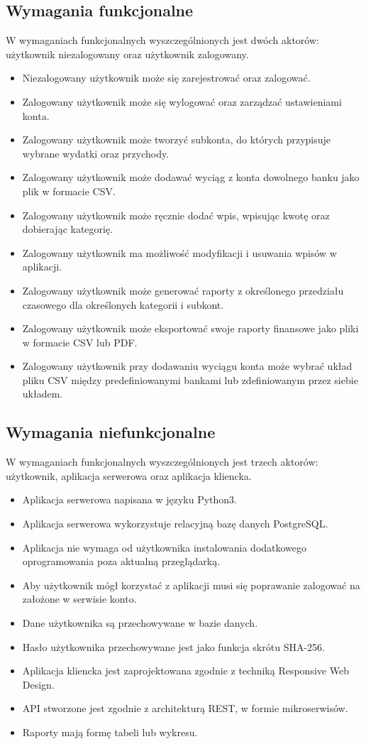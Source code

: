 \documentclass{article}
\begin{document}
	\subsection{Wymagania funkcjonalne}
	W wymaganiach funkcjonalnych wyszczególnionych jest dwóch aktorów: użytkownik niezalogowany oraz użytkownik zalogowany.
	\begin{itemize}
		\item Niezalogowany użytkownik może się zarejestrować oraz zalogować.
		\item Zalogowany użytkownik może się wylogować oraz zarządzać ustawieniami konta.
		\item Zalogowany użytkownik może tworzyć subkonta, do których przypisuje wybrane wydatki oraz przychody.
		\item Zalogowany użytkownik może dodawać wyciąg z konta dowolnego banku jako plik w formacie CSV.
		\item Zalogowany użytkownik może ręcznie dodać wpis, wpisując kwotę oraz dobierając kategorię.
		\item Zalogowany użytkownik ma możliwość modyfikacji i usuwania wpisów w aplikacji.
		\item Zalogowany użytkownik może generować raporty z określonego przedziału czasowego dla określonych kategorii i subkont.
		\item Zalogowany użytkownik może eksportować swoje raporty finansowe jako pliki w formacie CSV lub PDF.
		\item Zalogowany użytkownik przy dodawaniu wyciągu konta może wybrać układ pliku CSV między predefiniowanymi bankami lub zdefiniowanym przez siebie układem.
		
	\end{itemize}
	\subsection{Wymagania niefunkcjonalne}
	W wymaganiach funkcjonalnych wyszczególnionych jest trzech aktorów: użytkownik, aplikacja serwerowa oraz aplikacja kliencka.
	\begin{itemize}
		\item Aplikacja serwerowa napisana w języku Python3.
		\item Aplikacja serwerowa wykorzystuje relacyjną bazę danych PostgreSQL.
		\item Aplikacja nie wymaga od użytkownika instalowania dodatkowego oprogramowania poza aktualną przeglądarką.
		\item Aby użytkownik mógł korzystać z aplikacji musi się poprawanie zalogować na założone w serwisie konto.
		\item Dane użytkownika są przechowywane w bazie danych.
		\item Hasło użytkownika przechowywane jest jako funkcja skrótu SHA-256.
		\item Aplikacja kliencka jest zaprojektowana zgodnie z techniką Responsive Web Design.
		\item API stworzone jest zgodnie z architekturą REST, w formie mikroserwisów.
		\item Raporty mają formę tabeli lub wykresu.
	\end{itemize}
\end{document}
